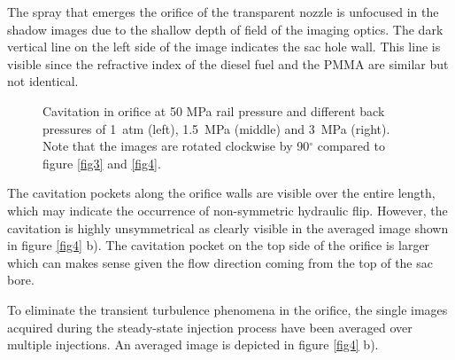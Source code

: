 \documentclass[letterpaper,twocolumn,10pt]{ilass}
\begin{document}
The spray that emerges the orifice of the transparent nozzle is unfocused in the shadow
images due to the shallow depth of field of the imaging optics. The dark vertical line on
the left side of the image indicates the sac hole wall. This line is visible since the
refractive index of the diesel fuel and the PMMA are similar but not identical.

\begin{figure}[h]
\begin{center}
\end{center}
\vspace*{-2mm}
\caption{Cavitation in orifice at 50 MPa rail pressure and different back pressures of
         1~atm (left), 1.5~MPa (middle) and 3~MPa (right). Note that the images are
				 rotated clockwise by 90$^{\circ}$ compared to figure \ref{fig3} and \ref{fig4}.}
\label{fig5} 
\end{figure}

The cavitation pockets along the orifice walls are visible over the entire length,
which may indicate the occurrence of non-symmetric hydraulic flip.
However, the cavitation is highly unsymmetrical as clearly visible in the averaged image shown
in figure \ref{fig4} b). The cavitation pocket on the top side of the orifice is larger which
can makes sense given the flow direction coming from the top of the sac bore.
%

To eliminate the transient turbulence phenomena in the orifice, the single images
acquired during the steady-state injection process have been averaged over multiple injections. An averaged image is depicted in figure \ref{fig4} b).
%
\end{document}
